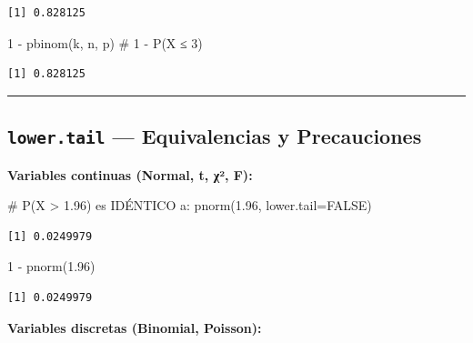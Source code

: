 \documentclass[
  letterpaper,
  DIV=11,
  numbers=noendperiod]{scrartcl}
\newenvironment{Shaded}{\begin{snugshade}}{\end{snugshade}}
\newcommand{\AttributeTok}[1]{\textcolor[rgb]{0.40,0.45,0.13}{#1}}
\newcommand{\CommentTok}[1]{\textcolor[rgb]{0.37,0.37,0.37}{#1}}
\newcommand{\ConstantTok}[1]{\textcolor[rgb]{0.56,0.35,0.01}{#1}}
\newcommand{\DecValTok}[1]{\textcolor[rgb]{0.68,0.00,0.00}{#1}}
\newcommand{\FloatTok}[1]{\textcolor[rgb]{0.68,0.00,0.00}{#1}}
\newcommand{\FunctionTok}[1]{\textcolor[rgb]{0.28,0.35,0.67}{#1}}
\newcommand{\NormalTok}[1]{\textcolor[rgb]{0.00,0.23,0.31}{#1}}
\newcommand{\SpecialCharTok}[1]{\textcolor[rgb]{0.37,0.37,0.37}{#1}}
\begin{document}
\begin{verbatim}
[1] 0.828125
\end{verbatim}

\begin{Shaded}
\begin{Highlighting}[]
\DecValTok{1} \SpecialCharTok{{-}} \FunctionTok{pbinom}\NormalTok{(k, n, p)                }\CommentTok{\# 1 {-} P(X ≤ 3)}
\end{Highlighting}
\end{Shaded}

\begin{verbatim}
[1] 0.828125
\end{verbatim}

\begin{center}\rule{0.5\linewidth}{0.5pt}\end{center}

\subsection{\texorpdfstring{\texttt{lower.tail} --- Equivalencias y
Precauciones}{lower.tail --- Equivalencias y Precauciones}}\label{lower.tail-equivalencias-y-precauciones}

\textbf{Variables continuas (Normal, t, χ², F):}

\begin{Shaded}
\begin{Highlighting}[]
\CommentTok{\# P(X \textgreater{} 1.96) es IDÉNTICO a:}
\FunctionTok{pnorm}\NormalTok{(}\FloatTok{1.96}\NormalTok{, }\AttributeTok{lower.tail=}\ConstantTok{FALSE}\NormalTok{)}
\end{Highlighting}
\end{Shaded}

\begin{verbatim}
[1] 0.0249979
\end{verbatim}

\begin{Shaded}
\begin{Highlighting}[]
\DecValTok{1} \SpecialCharTok{{-}} \FunctionTok{pnorm}\NormalTok{(}\FloatTok{1.96}\NormalTok{)}
\end{Highlighting}
\end{Shaded}

\begin{verbatim}
[1] 0.0249979
\end{verbatim}

\textbf{Variables discretas (Binomial, Poisson):}
\end{document}
